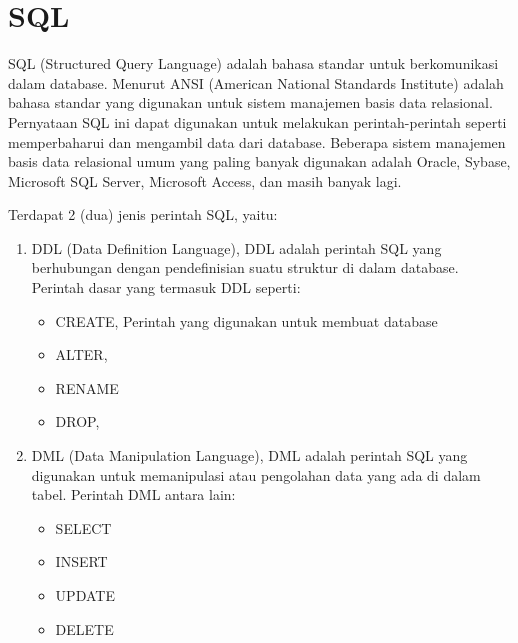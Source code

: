 \section{SQL}
SQL (Structured Query Language) adalah bahasa standar untuk berkomunikasi dalam database. Menurut ANSI (American National Standards Institute) adalah bahasa standar yang digunakan untuk sistem manajemen basis data relasional. Pernyataan SQL ini dapat digunakan untuk melakukan perintah-perintah seperti memperbaharui dan mengambil data dari database. Beberapa sistem manajemen basis data relasional umum yang paling banyak digunakan adalah Oracle, Sybase, Microsoft SQL Server, Microsoft Access, dan masih banyak lagi.
\par
Terdapat 2 (dua) jenis perintah SQL, yaitu:
\begin{enumerate}
\item DDL (Data Definition Language), DDL adalah perintah SQL yang berhubungan dengan pendefinisian suatu struktur di dalam database. Perintah dasar yang termasuk DDL seperti:

\begin{itemize}
\item CREATE, Perintah yang digunakan untuk membuat database
\item ALTER, 
\item RENAME
\item DROP, 
\end{itemize}

\item DML (Data Manipulation Language), DML adalah perintah SQL yang digunakan untuk memanipulasi atau pengolahan data yang ada di dalam tabel. Perintah DML antara lain:

\begin{itemize}
\item SELECT
\item INSERT
\item UPDATE
\item DELETE
\end{itemize}
\end{enumerate}